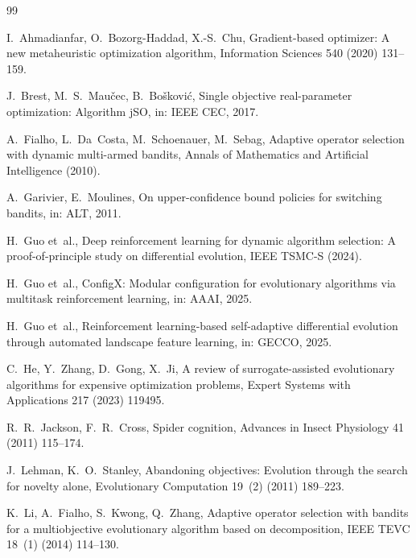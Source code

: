 \documentclass[preprint,12pt,authoryear]{elsarticle}
\begin{document}
\begin{thebibliography}{99}

I.~Ahmadianfar, O.~Bozorg-Haddad, X.-S.~Chu, Gradient-based optimizer: A new metaheuristic optimization algorithm, Information Sciences 540 (2020) 131--159.

J.~Brest, M.~S.~Mau\v{c}ec, B.~Bo\v{s}kovi\'c, Single objective real-parameter optimization: Algorithm jSO, in: IEEE CEC, 2017.

A.~Fialho, L.~Da~Costa, M.~Schoenauer, M.~Sebag, Adaptive operator selection with dynamic multi-armed bandits, Annals of Mathematics and Artificial Intelligence (2010).

A.~Garivier, E.~Moulines, On upper-confidence bound policies for switching bandits, in: ALT, 2011.

H.~Guo et~al., Deep reinforcement learning for dynamic algorithm selection: A proof-of-principle study on differential evolution, IEEE TSMC-S (2024).

H.~Guo et~al., ConfigX: Modular configuration for evolutionary algorithms via multitask reinforcement learning, in: AAAI, 2025.

H.~Guo et~al., Reinforcement learning-based self-adaptive differential evolution through automated landscape feature learning, in: GECCO, 2025.

C.~He, Y.~Zhang, D.~Gong, X.~Ji, A review of surrogate-assisted evolutionary algorithms for expensive optimization problems, Expert Systems with Applications 217 (2023) 119495.

R.~R.~Jackson, F.~R.~Cross, Spider cognition, Advances in Insect Physiology 41 (2011) 115--174.

J.~Lehman, K.~O.~Stanley, Abandoning objectives: Evolution through the search for novelty alone, Evolutionary Computation 19~(2) (2011) 189--223.

K.~Li, A.~Fialho, S.~Kwong, Q.~Zhang, Adaptive operator selection with bandits for a multiobjective evolutionary algorithm based on decomposition, IEEE TEVC 18~(1) (2014) 114--130.


\end{thebibliography}
\end{document}
